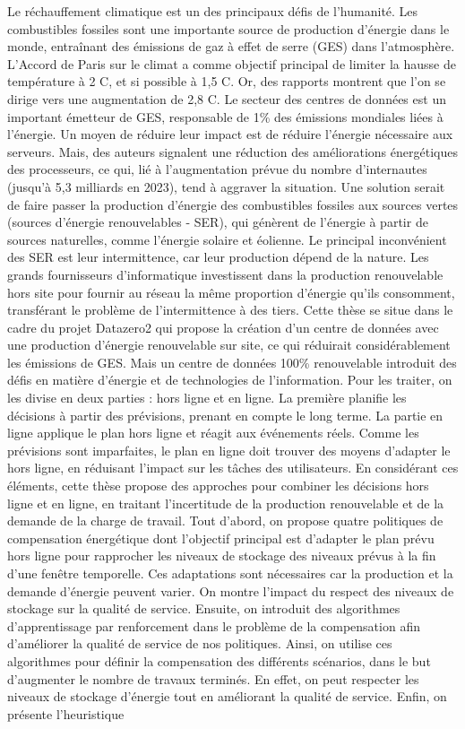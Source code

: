 \vspace{-0.7cm}
Le réchauffement climatique est un des principaux défis de l'humanité. Les combustibles fossiles sont une importante source de production d'énergie dans le monde, entraînant des émissions de gaz à effet de serre (GES) dans l'atmosphère. L'Accord de Paris sur le climat a comme objectif principal de limiter la hausse de température à 2 \degree C, et si possible à 1,5 \degree C. Or, des rapports montrent que l'on se dirige vers une augmentation de 2,8 \degree C. Le secteur des centres de données est un important émetteur de GES, responsable de 1\% des émissions mondiales liées à l'énergie. Un moyen de réduire leur impact est de réduire l'énergie nécessaire aux serveurs. Mais, des auteurs signalent une réduction des améliorations énergétiques des processeurs, ce qui, lié à l'augmentation prévue du nombre d'internautes (jusqu'à 5,3 milliards en 2023), tend à aggraver la situation. Une solution serait de faire passer la production d'énergie des combustibles fossiles aux sources vertes (sources d'énergie renouvelables - SER), qui génèrent de l'énergie à partir de sources naturelles, comme l'énergie solaire et éolienne. Le principal inconvénient des SER est leur intermittence, car leur production dépend de la nature. Les grands fournisseurs d'informatique investissent dans la production renouvelable hors site pour fournir au réseau la même proportion d'énergie qu'ils consomment, transférant le problème de l'intermittence à des tiers. Cette thèse se situe dans le cadre du projet Datazero2 qui propose la création d'un centre de données avec une production d'énergie renouvelable sur site, ce qui réduirait considérablement les émissions de GES. Mais un centre de données 100\% renouvelable introduit des défis en matière d'énergie et de technologies de l'information. Pour les traiter, on les divise en deux parties : hors ligne et en ligne. La première planifie les décisions à partir des prévisions, prenant en compte le long terme. La partie en ligne applique le plan hors ligne et réagit aux événements réels. Comme les prévisions sont imparfaites, le plan en ligne doit trouver des moyens d'adapter le hors ligne, en réduisant l'impact sur les tâches des utilisateurs. En considérant ces éléments, cette thèse propose des approches pour combiner les décisions hors ligne et en ligne, en traitant l'incertitude de la production renouvelable et de la demande de la charge de travail. Tout d'abord, on propose quatre politiques de compensation énergétique dont l'objectif principal est d'adapter le plan prévu hors ligne pour rapprocher les niveaux de stockage des niveaux prévus à la fin d'une fenêtre temporelle. Ces adaptations sont nécessaires car la production et la demande d'énergie peuvent varier. On montre l'impact du respect des niveaux de stockage sur la qualité de service. Ensuite, on introduit des algorithmes d'apprentissage par renforcement dans le problème de la compensation afin d'améliorer la qualité de service de nos politiques. Ainsi, on utilise ces algorithmes pour définir la compensation des différents scénarios, dans le but d'augmenter le nombre de travaux terminés. En effet, on peut respecter les niveaux de stockage d'énergie tout en améliorant la qualité de service. Enfin, on présente l'heuristique 